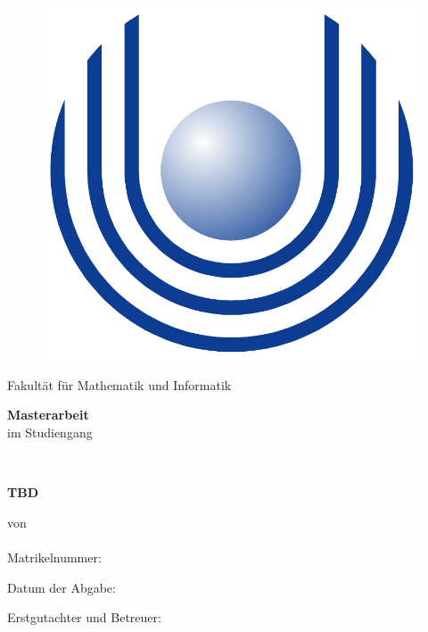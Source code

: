 \begin{center}

    \begin{figure}[htbp]
        \centering
        \includegraphics[scale=0.12]{./Images/fernuni-logo.pdf}
    \end{figure}
    
    \Large \uni
    
    \small Fakultät für Mathematik und Informatik %
    
    \vspace{0.5cm}
    
    \large \textbf{Masterarbeit} \\
    
    \large im Studiengang \autorStudiengang \\
    
    \vspace{1.0cm}
    
    \Large \textbf{\thema} \\
    
    \vspace{0.5cm}
    
    \normalsize \textbf{TBD} 
    
    \vspace{0.5cm}
    
    \large von \\ \autor\ \\ \small{Matrikelnummer: \autorMat}
    
    
    \vspace{1.0cm}
    
    \small Datum der Abgabe: \abgabedatum {}
    
    \vspace{0.5cm}
    
    \small Erstgutachter und Betreuer: \prueferA
    
    
\end{center}

\restoregeometry